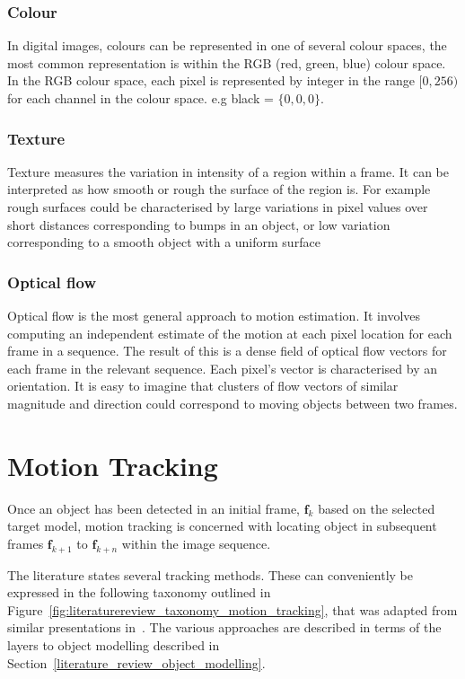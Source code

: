 \subsubsection{Colour}
In digital images, colours can be represented in one of several colour spaces, the
most common representation is within the RGB (red, green, blue) colour space. In
the RGB colour space, each pixel is represented by integer in the range
$[0,256)$ for each channel in the colour space. e.g black = $\{0,0,0\}$.

\subsubsection{Texture}
Texture measures the variation in intensity of a region within a frame. It can
be interpreted as how smooth or rough the surface of the region is.
For example rough surfaces could be characterised by large variations in pixel
values over short distances corresponding to bumps in an object, or low
variation corresponding to a smooth object with a uniform surface\cite{Porikli2012}

\subsubsection{Optical flow}
Optical flow is the most general approach to motion estimation. It involves
computing an independent estimate of the motion at each pixel location for each
frame in a sequence.
The result of this is a dense field of optical flow vectors for each frame in
the relevant sequence. Each pixel's vector is characterised by an orientation.
It is easy to imagine that clusters of flow vectors of similar magnitude and
direction could correspond to moving objects between two
frames\cite{Szeliski2010}.

\section{Motion Tracking}
Once an object has been detected in an initial frame, $\mathbf{f}_k$ based on the selected
target model, motion tracking is concerned with locating object in subsequent
frames $\mathbf{f}_{k+1}$ to $\mathbf{f}_{k+n}$ within the image sequence. 

The literature states several tracking methods. These can
conveniently be expressed in the following taxonomy outlined in
Figure~\ref{fig:literaturereview_taxonomy_motion_tracking}, that was adapted
from similar presentations in~\cite{Prajapati2015, Patel2013}. The various
approaches are described in terms of the layers to object modelling described in
Section~\ref{literature_review_object_modelling}.

